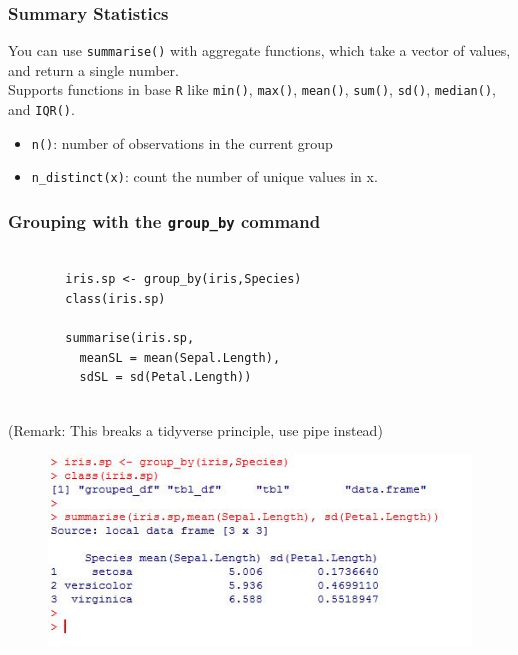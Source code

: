 \documentclass{beamer}
\begin{document}
\begin{frame}
	\frametitle{Summary Statistics}
	\Large
	You can use \texttt{summarise()} with aggregate functions, which take a vector of values, and return a single number.\\ \bigskip Supports functions in base \texttt{R} like \texttt{min()}, \texttt{max()}, \texttt{mean()}, \texttt{sum()}, \texttt{sd()}, \texttt{median()}, and \texttt{IQR()}.\\ \bigskip 
	\begin{itemize}
		\item 
		\texttt{n()}: number of observations in the current group
		\item 
		\texttt{n\_distinct(x)}: count the number of unique values in x.
	\end{itemize}
	
\end{frame}
\begin{frame}[fragile]
	\frametitle{Grouping with the \texttt{group\_by} command}
	\LARGE
	\vspace{-1cm}
	\begin{framed}
		\begin{verbatim}
		
		iris.sp <- group_by(iris,Species)
		class(iris.sp)
		
		summarise(iris.sp,
		  meanSL = mean(Sepal.Length), 
		  sdSL = sd(Petal.Length))
		
		\end{verbatim}
	\end{framed}
{\large
(Remark: This breaks a tidyverse principle, use pipe instead)
}
\end{frame}
\begin{frame}
	\begin{figure}
		\centering
		\includegraphics[width=1.05\linewidth]{images/irisgroupby}
	\end{figure}
\end{frame}	
\end{document}
